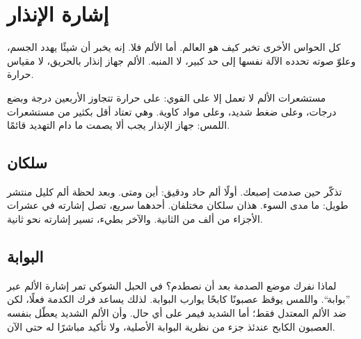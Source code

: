 \chapter{إشارة الإنذار}


كل الحواس الأخرى تخبر كيف هو العالم. أما الألم فلا. إنه يخبر أن شيئًا يهدد الجسم، وعلوّ صوته تحدده الآلة نفسها إلى حد كبير، لا المنبه. الألم جهاز إنذار بالحريق، لا مقياس حرارة.

مستشعرات الألم لا تعمل إلا على القوي: على حرارة تتجاوز الأربعين درجة وبضع درجات، وعلى ضغط شديد، وعلى مواد كاوية. وهي تعتاد أقل بكثير من مستشعرات اللمس: جهاز الإنذار يجب ألا يصمت ما دام التهديد قائمًا.

\section*{سلكان}

تذكّر حين صدمت إصبعك. أولًا ألم حاد ودقيق: أين ومتى. وبعد لحظة ألم كليل منتشر طويل: ما مدى السوء. هذان سلكان مختلفان. أحدهما سريع، تصل إشارته في عشرات الأجزاء من ألف من الثانية. والآخر بطيء، تسير إشارته نحو ثانية.

\section*{البوابة}

لماذا نفرك موضع الصدمة بعد أن نصطدم؟ في الحبل الشوكي تمر إشارة الألم عبر ”بوابة“. واللمس يوقظ عصبونًا كابحًا يوارب البوابة. لذلك يساعد فرك الكدمة فعلًا، لكن ضد الألم المعتدل فقط؛ أما الشديد فيمر على أي حال. وأن الألم الشديد يعطّل بنفسه العصبون الكابح عندئذ جزء من نظرية البوابة الأصلية، ولا تأكيد مباشرًا له حتى الآن.



